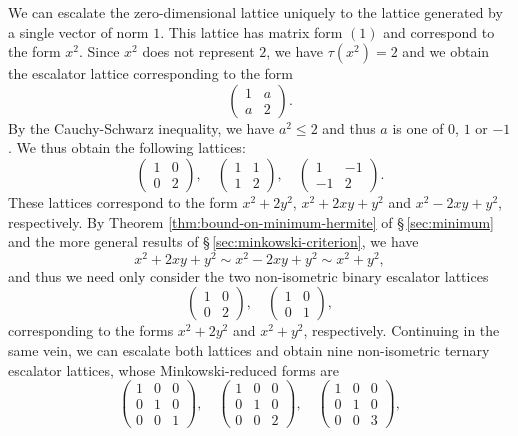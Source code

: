 We can escalate the zero-dimensional lattice uniquely to the lattice generated
by a single vector of norm \(1\). This lattice has matrix form \((1)\) and
correspond to the form \(x^2\). Since \(x^2\) does not represent \(2\), we have
\(\tau(x^2) = 2\) and we obtain the escalator lattice corresponding to the form
\[
    \begin{pmatrix}
        1 & a \\
        a & 2
    \end{pmatrix}.
\]
By the Cauchy-Schwarz inequality, we have \(a^2 \leq 2\) and thus \(a\) is one
of \(0\), \(1\) or \(-1\). We thus obtain the following lattices:
\[
    \begin{pmatrix}
        1 & 0 \\
        0 & 2
    \end{pmatrix}, \quad
    \begin{pmatrix}
        1 & 1 \\
        1 & 2
    \end{pmatrix}, \quad
    \begin{pmatrix}
        1 & -1 \\
        -1 & 2
    \end{pmatrix}.
\]
These lattices correspond to the form \(x^2 + 2y^2\), \(x^2 + 2xy + y^2\) and
\(x^2 - 2xy + y^2\), respectively. By Theorem \ref{thm:bound-on-minimum-hermite}
of \S\,\ref{sec:minimum} and the more general results of
\S\,\ref{sec:minkowski-criterion}, we have
\[
    x^2 + 2xy + y^2 \sim x^2 - 2xy + y^2 \sim x^2 + y^2,
\]  
and thus we need only consider the two non-isometric binary escalator lattices
\[
    \begin{pmatrix}
        1 & 0 \\
        0 & 2
    \end{pmatrix}, \quad
    \begin{pmatrix}
        1 & 0 \\
        0 & 1
    \end{pmatrix},
\]
corresponding to the forms \(x^2 + 2y^2\) and \(x^2 + y^2\), respectively.
Continuing in the same vein, we can escalate both lattices and obtain nine
non-isometric ternary escalator lattices, whose Minkowski-reduced forms are
\[
    \begin{pmatrix}
        1 & 0 & 0 \\
        0 & 1 & 0 \\
        0 & 0 & 1
    \end{pmatrix}, \quad
    \begin{pmatrix}
        1 & 0 & 0 \\
        0 & 1 & 0 \\
        0 & 0 & 2
    \end{pmatrix}, \quad
    \begin{pmatrix}
        1 & 0 & 0 \\
        0 & 1 & 0 \\
        0 & 0 & 3
    \end{pmatrix},
\]
